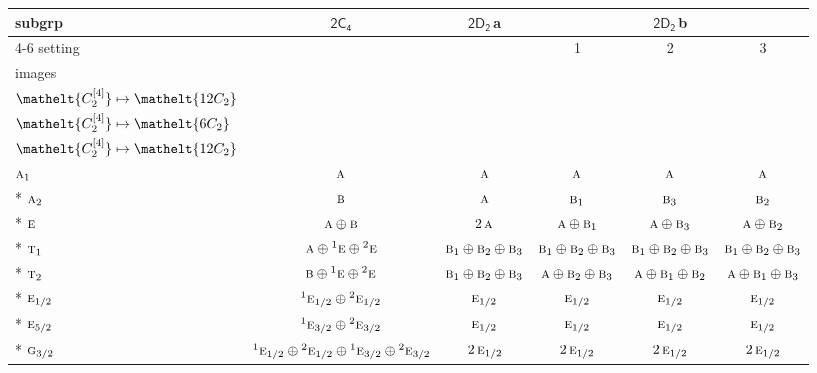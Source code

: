 \documentclass[10pt,a4paper]{article}
\numberwithin{equation}{section}
\newcommand{\eltfont}[1]{{\let\sigma\eltsigma\mathelt{#1}}}
\newcommand{\grp}[1]{\mathsf{#1}}
\newcommand{\irr}[1]{\text{\normalfont\scshape #1}}
\newcommand{\conjpair}[1]{{}^{#1}}
\newcommand{\cls}[1]{\eltfont{#1}}
\newcommand{\clsletter}[1]{\,{\scriptsize\color{black!55}#1}}
\newcommand{\genidx}[2]{#1^{[\mathrm{#2}]}}
\begin{document}
{\small\begin{longtable}{@{}lccccc@{}}\toprule
subgrp & \href{2C4.pdf}{$\grp{2C_{4}}$} & \href{2D2.pdf}{$\grp{2D_{2}}$}\clsletter{a} & \multicolumn{3}{c}{\href{2D2.pdf}{$\grp{2D_{2}}$}\clsletter{b}}\\\cmidrule(lr){4-6}
setting &  &  & 1 & 2 & 3\\
images &  &  & {\scriptsize\begin{tabular}[t]{@{}c@{}}$\cls{\genidx{C_{2}}{2}} \mapsto \cls{6C_{2}}$\\$\cls{\genidx{C_{2}}{4}} \mapsto \cls{12C_{2}}$\end{tabular}} & {\scriptsize\begin{tabular}[t]{@{}c@{}}$\cls{\genidx{C_{2}}{2}} \mapsto \cls{12C_{2}}$\\$\cls{\genidx{C_{2}}{4}} \mapsto \cls{6C_{2}}$\end{tabular}} & {\scriptsize\begin{tabular}[t]{@{}c@{}}$\cls{\genidx{C_{2}}{2}} \mapsto \cls{12C_{2}}$\\$\cls{\genidx{C_{2}}{4}} \mapsto \cls{12C_{2}}$\end{tabular}}\\\midrule\endhead
\bottomrule\endfoot\endlastfoot
$\irr{a}_{1}$ & $\irr{a}$ & $\irr{a}$ & $\irr{a}$ & $\irr{a}$ & $\irr{a}$\\*
$\irr{a}_{2}$ & $\irr{b}$ & $\irr{a}$ & $\irr{b}_{1}$ & $\irr{b}_{3}$ & $\irr{b}_{2}$\\*
$\irr{e}$ & $\irr{a}\oplus \irr{b}$ & $2\,\irr{a}$ & $\irr{a}\oplus \irr{b}_{1}$ & $\irr{a}\oplus \irr{b}_{3}$ & $\irr{a}\oplus \irr{b}_{2}$\\*
$\irr{t}_{1}$ & $\irr{a}\oplus \conjpair{1}\irr{e}\oplus \conjpair{2}\irr{e}$ & $\irr{b}_{1}\oplus \irr{b}_{2}\oplus \irr{b}_{3}$ & $\irr{b}_{1}\oplus \irr{b}_{2}\oplus \irr{b}_{3}$ & $\irr{b}_{1}\oplus \irr{b}_{2}\oplus \irr{b}_{3}$ & $\irr{b}_{1}\oplus \irr{b}_{2}\oplus \irr{b}_{3}$\\*
$\irr{t}_{2}$ & $\irr{b}\oplus \conjpair{1}\irr{e}\oplus \conjpair{2}\irr{e}$ & $\irr{b}_{1}\oplus \irr{b}_{2}\oplus \irr{b}_{3}$ & $\irr{a}\oplus \irr{b}_{2}\oplus \irr{b}_{3}$ & $\irr{a}\oplus \irr{b}_{1}\oplus \irr{b}_{2}$ & $\irr{a}\oplus \irr{b}_{1}\oplus \irr{b}_{3}$\\*
$\irr{e}_{1/2}$ & $\conjpair{1}\irr{e}_{1/2}\oplus \conjpair{2}\irr{e}_{1/2}$ & $\irr{e}_{1/2}$ & $\irr{e}_{1/2}$ & $\irr{e}_{1/2}$ & $\irr{e}_{1/2}$\\*
$\irr{e}_{5/2}$ & $\conjpair{1}\irr{e}_{3/2}\oplus \conjpair{2}\irr{e}_{3/2}$ & $\irr{e}_{1/2}$ & $\irr{e}_{1/2}$ & $\irr{e}_{1/2}$ & $\irr{e}_{1/2}$\\*
$\irr{g}_{3/2}$ & $\conjpair{1}\irr{e}_{1/2}\oplus \conjpair{2}\irr{e}_{1/2}\oplus \conjpair{1}\irr{e}_{3/2}\oplus \conjpair{2}\irr{e}_{3/2}$ & $2\,\irr{e}_{1/2}$ & $2\,\irr{e}_{1/2}$ & $2\,\irr{e}_{1/2}$ & $2\,\irr{e}_{1/2}$\\
\bottomrule\end{longtable}}
\end{document}
